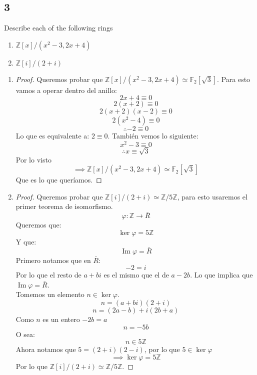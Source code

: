 \documentclass[11pt]{article}
\newcommand{\set}[1]{\mathbb{#1}}
\DeclareMathOperator{\Ima}{Im}
\theoremstyle{definition}
\begin{document}
        \subsection{3}
        Describe each of the following rings
        \begin{enumerate}[label=\textbf{(\alph*)}]
            \item $\set{Z}[x]/(x^2-3,2x+4)$

            \item $\set{Z}[i]/(2+i)$
        \end{enumerate}
        \begin{enumerate}[label=\textbf{(\alph*)}]
            \item \begin{proof}
                Queremos probar que $\set{Z}[x]/(x^2-3,2x+4)\simeq\set{F}_2[\sqrt{3}]$. Para esto vamos a operar dentro del anillo:
                \[2x+4\equiv 0\]
                \[2(x+2)\equiv 0\]
                \[2(x+2)(x-2)\equiv 0\]
                \[2(x^2-4)\equiv 0\]
                \[\therefore -2\equiv 0\]
                Lo que es equivalente a: $2\equiv 0$. También vemos lo siguiente:
                \[x^2-3\equiv0\]
                \[\therefore x\equiv\sqrt{3}\]
                Por lo visto
                \[\implies \set{Z}[x]/(x^2-3,2x+4)\simeq \set{F}_2[\sqrt{3}]\]
                Que es lo que queríamos.
            \end{proof}

            \item \begin{proof}
                Queremos probar que $\set{Z}[i]/(2+i)\simeq\set{Z}/5\set{Z}$, para esto usaremos el primer teorema de isomorfismo.
                \[\varphi:\set{Z}\rightarrow \bar{R}\]
                Queremos que:
                \[\ker\varphi=5\set{Z}\]
                Y que:
                \[\Ima\varphi=\bar{R}\]
                Primero notamos que en $\bar{R}$:
                \[-2=i\]
                Por lo que el resto de $a+bi$ es el mismo que el de $a-2b$. Lo que implica que $\Ima\varphi=\bar{R}$.\\
                Tomemos un elemento $n\in\ker\varphi$.
                \[n=(a+bi)(2+i)\]
                \[n=(2a-b)+i(2b+a)\]
                Como $n$ es un entero $-2b=a$
                \[n=-5b\]
                O sea:
                \[n\in5\set{Z}\]
                Ahora notamos que $5=(2+i)(2-i)$, por lo que $5\in\ker\varphi$
                \[\implies \ker\varphi=5\set{Z}\]
                Por lo que $\set{Z}[i]/(2+i)\simeq\set{Z}/5\set{Z}$.
            \end{proof}
        \end{enumerate}
\end{document}
